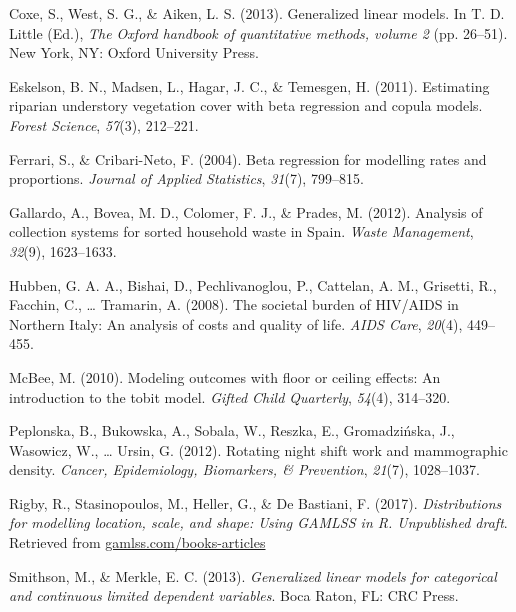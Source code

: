 \documentclass[english,man]{apa6}
\theoremstyle{definition}
\theoremstyle{definition}
\theoremstyle{remark}
\begin{document}
\hypertarget{ref-coxe2013generalized}{}
Coxe, S., West, S. G., \& Aiken, L. S. (2013). Generalized linear
models. In T. D. Little (Ed.), \emph{The Oxford handbook of quantitative
methods, volume 2} (pp. 26--51). New York, NY: Oxford University Press.

\hypertarget{ref-eskelson2011estimating}{}
Eskelson, B. N., Madsen, L., Hagar, J. C., \& Temesgen, H. (2011).
Estimating riparian understory vegetation cover with beta regression and
copula models. \emph{Forest Science}, \emph{57}(3), 212--221.

\hypertarget{ref-ferrari2004beta}{}
Ferrari, S., \& Cribari-Neto, F. (2004). Beta regression for modelling
rates and proportions. \emph{Journal of Applied Statistics},
\emph{31}(7), 799--815.

\hypertarget{ref-gallardo2012analysis}{}
Gallardo, A., Bovea, M. D., Colomer, F. J., \& Prades, M. (2012).
Analysis of collection systems for sorted household waste in Spain.
\emph{Waste Management}, \emph{32}(9), 1623--1633.

\hypertarget{ref-hubben2008societal}{}
Hubben, G. A. A., Bishai, D., Pechlivanoglou, P., Cattelan, A. M.,
Grisetti, R., Facchin, C., \ldots{} Tramarin, A. (2008). The societal
burden of HIV/AIDS in Northern Italy: An analysis of costs and quality
of life. \emph{AIDS Care}, \emph{20}(4), 449--455.

\hypertarget{ref-mcbee2010modeling}{}
McBee, M. (2010). Modeling outcomes with floor or ceiling effects: An
introduction to the tobit model. \emph{Gifted Child Quarterly},
\emph{54}(4), 314--320.

\hypertarget{ref-peplonska2012rotating}{}
Peplonska, B., Bukowska, A., Sobala, W., Reszka, E., Gromadzińska, J.,
Wasowicz, W., \ldots{} Ursin, G. (2012). Rotating night shift work and
mammographic density. \emph{Cancer, Epidemiology, Biomarkers, \&
Prevention}, \emph{21}(7), 1028--1037.

\hypertarget{ref-rigby2017distributions}{}
Rigby, R., Stasinopoulos, M., Heller, G., \& De Bastiani, F. (2017).
\emph{Distributions for modelling location, scale, and shape: Using
GAMLSS in R. Unpublished draft}. Retrieved from
\url{gamlss.com/books-articles}

\hypertarget{ref-smithson2013generalized}{}
Smithson, M., \& Merkle, E. C. (2013). \emph{Generalized linear models
for categorical and continuous limited dependent variables}. Boca Raton,
FL: CRC Press.
\end{document}
